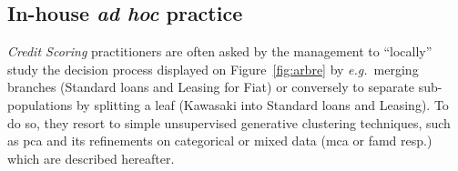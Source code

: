\subsection{In-house \textit{ad hoc} practice} \label{subsec:adhoc}

\textit{Credit Scoring} practitioners are often asked by the management to ``locally'' study the decision process displayed on Figure~\ref{fig:arbre} by \textit{e.g.}\ merging branches (Standard loans and Leasing for Fiat) or conversely to separate sub-populations by splitting a leaf (Kawasaki into Standard loans and Leasing). To do so, they resort to simple unsupervised generative clustering techniques, such as \gls{pca} and its refinements on categorical or mixed data (\gls{mca} or \gls{famd} resp.) which are described hereafter.

\paragraph{}

